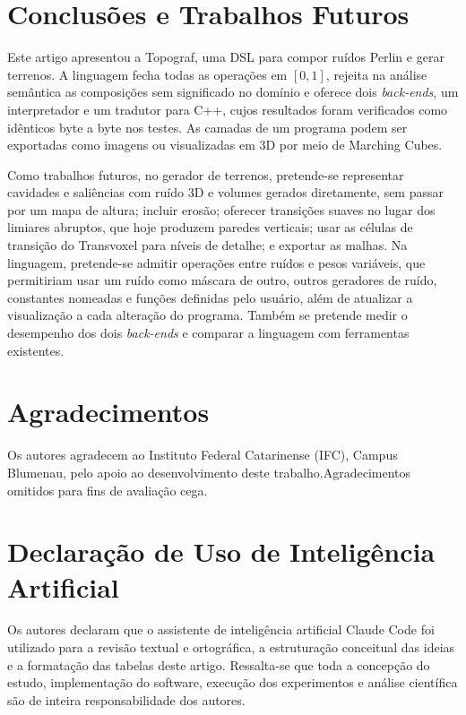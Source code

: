 \documentclass[sigconf, nonacm, screen, language=portuguese, language={main=english}]{acmart}
\newcommand{\anonfinal}[2]{\ifdefined\versaofinal#2\else#1\fi}
\begin{document}
\section{Conclusões e Trabalhos Futuros}\label{sec:conclusao}
Este artigo apresentou a Topograf, uma DSL para compor ruídos Perlin e
gerar terrenos. A linguagem fecha todas as operações em $[0,1]$, rejeita
na análise semântica as composições sem significado no domínio e
oferece dois \textit{back-ends}, um interpretador e um tradutor para
C++, cujos resultados foram verificados como idênticos byte a byte nos
testes. As camadas de um programa podem ser exportadas como imagens ou
visualizadas em 3D por meio de Marching Cubes.

Como trabalhos futuros, no gerador de terrenos, pretende-se representar
cavidades e saliências com ruído 3D e volumes gerados diretamente, sem
passar por um mapa de altura; incluir erosão; oferecer transições
suaves no lugar dos limiares abruptos, que hoje produzem paredes
verticais; usar as células de transição do Transvoxel para níveis de
detalhe; e exportar as malhas. Na linguagem, pretende-se admitir
operações entre ruídos e pesos variáveis, que permitiriam usar um ruído
como máscara de outro, outros geradores de ruído, constantes nomeadas e
funções definidas pelo usuário, além de atualizar a visualização a cada
alteração do programa. Também se pretende medir o desempenho dos dois
\textit{back-ends} e comparar a linguagem com ferramentas existentes.

\section*{Agradecimentos}
\anonfinal{Agradecimentos omitidos para fins de avaliação cega.}{Os autores agradecem ao Instituto Federal Catarinense (IFC), Campus Blumenau, pelo apoio ao desenvolvimento deste trabalho.}

\section*{Declaração de Uso de Inteligência Artificial}
Os autores declaram que o assistente de inteligência artificial Claude Code foi
utilizado para a revisão textual e ortográfica, a estruturação conceitual das
ideias e a formatação das tabelas deste artigo. Ressalta-se que toda a
concepção do estudo, implementação do software, execução dos experimentos e
análise científica são de inteira responsabilidade dos autores.



\end{document}
